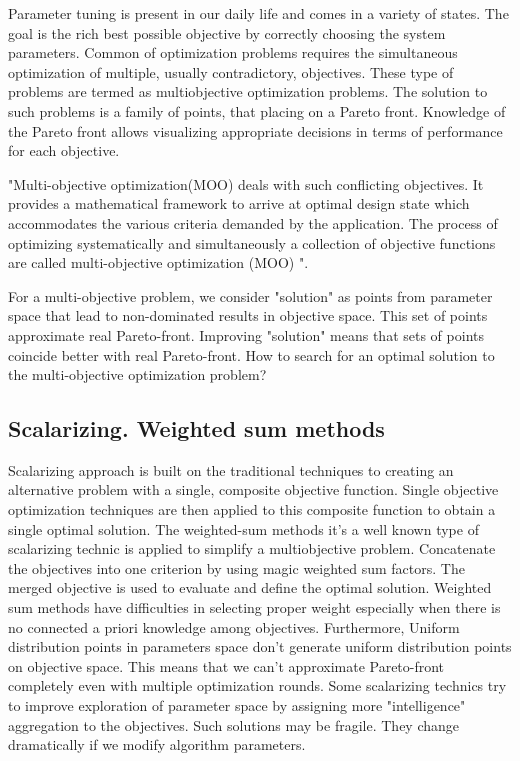         Parameter tuning is present in our daily life and comes in a variety of states. The goal is the rich best possible objective by correctly choosing the system parameters. 
        Common of optimization problems requires the simultaneous optimization of multiple, usually contradictory, objectives. These type of problems are termed as multiobjective optimization problems. The solution to such problems is a family of points, that placing on a Pareto front. Knowledge of the Pareto front allows visualizing appropriate decisions in terms of performance for each objective.

        "Multi-objective optimization(MOO) deals with such conflicting objectives. It provides a
        mathematical framework to arrive at optimal design state which accommodates the various criteria demanded by
        the application. The process of optimizing systematically and simultaneously a collection of objective functions
        are called multi-objective optimization (MOO) \cite{odugod2013}".

        For a multi-objective problem, we consider "solution" as points from parameter space that lead to non-dominated results in objective space. This set of points approximate real Pareto-front. Improving "solution" means that sets of points coincide better with real Pareto-front.
        How to search for an optimal solution to the multi-objective optimization problem?

        \subsection{Scalarizing. Weighted sum methods}

            Scalarizing approach is built on the traditional techniques to creating an alternative problem with a single,
            composite objective function. Single objective optimization techniques are then applied to this composite function to obtain a single optimal solution.
            The weighted-sum methods it's a well known type of scalarizing technic is applied to simplify a multiobjective problem. Concatenate the objectives into one criterion by using magic weighted sum factors. 
            The merged objective is used to evaluate and define the optimal solution.
            Weighted sum methods have difficulties in selecting proper weight especially when there is no connected a priori knowledge among objectives.
            Furthermore, Uniform distribution points in parameters space don't generate uniform distribution points on objective space. This means that we can't approximate Pareto-front completely even with multiple optimization rounds.
            Some scalarizing technics try to improve exploration of parameter space by assigning more "intelligence" aggregation to the objectives. Such solutions may be fragile. They change dramatically if we modify algorithm parameters.

